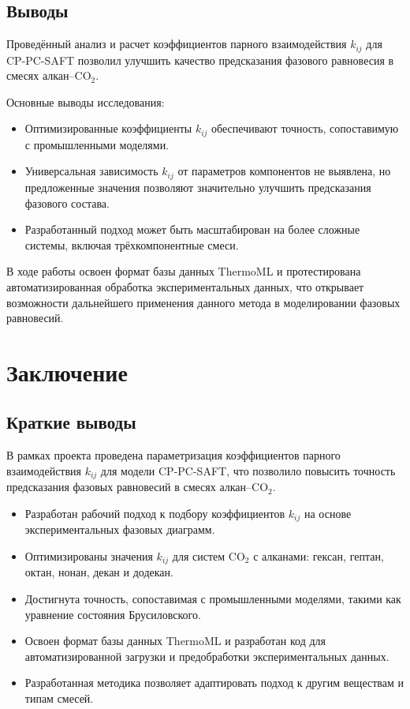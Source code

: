 \documentclass[a4paper,12pt]{article}
\begin{document}
\subsection{Выводы}

Проведённый анализ и расчет коэффициентов парного взаимодействия \( k_{ij} \) для CP-PC-SAFT позволил улучшить качество предсказания фазового равновесия в смесях алкан–$\mathrm{CO}_{2}$.

Основные выводы исследования:
\begin{itemize}
    \item Оптимизированные коэффициенты \( k_{ij} \) обеспечивают точность, сопоставимую с промышленными моделями.
    \item Универсальная зависимость \( k_{ij} \) от параметров компонентов не выявлена, но предложенные значения позволяют значительно улучшить предсказания фазового состава.
    \item Разработанный подход может быть масштабирован на более сложные системы, включая трёхкомпонентные смеси.
\end{itemize}

В ходе работы освоен формат базы данных ThermoML и протестирована автоматизированная обработка экспериментальных данных, что открывает возможности дальнейшего применения данного метода в моделировании фазовых равновесий.

\section{Заключение}

\subsection{Краткие выводы}

В рамках проекта проведена параметризация коэффициентов парного взаимодействия \( k_{ij} \) для модели CP-PC-SAFT, что позволило повысить точность предсказания фазовых равновесий в смесях алкан–$\mathrm{CO}_{2}$.

\begin{itemize}
    \item Разработан рабочий подход к подбору коэффициентов \( k_{ij} \) на основе экспериментальных фазовых диаграмм.
    \item Оптимизированы значения \( k_{ij} \) для систем $\mathrm{CO}_{2}$ с алканами: гексан, гептан, октан, нонан, декан и додекан.
    \item Достигнута точность, сопоставимая с промышленными моделями, такими как уравнение состояния Брусиловского.
    \item Освоен формат базы данных ThermoML и разработан код для автоматизированной загрузки и предобработки экспериментальных данных.
    \item Разработанная методика позволяет адаптировать подход к другим веществам и типам смесей.
\end{itemize}
\end{document}

